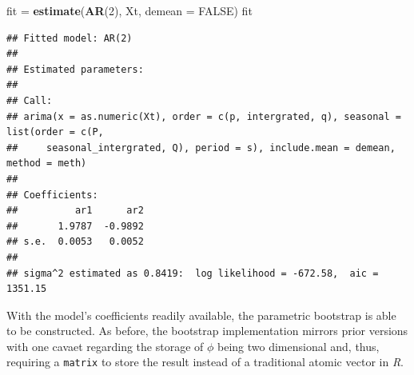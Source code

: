 \documentclass[]{book}
\newenvironment{Shaded}{\begin{snugshade}}{\end{snugshade}}
\newcommand{\CommentTok}[1]{\textcolor[rgb]{0.56,0.35,0.01}{\textit{#1}}}
\newcommand{\ControlFlowTok}[1]{\textcolor[rgb]{0.13,0.29,0.53}{\textbf{#1}}}
\newcommand{\DataTypeTok}[1]{\textcolor[rgb]{0.13,0.29,0.53}{#1}}
\newcommand{\DecValTok}[1]{\textcolor[rgb]{0.00,0.00,0.81}{#1}}
\newcommand{\KeywordTok}[1]{\textcolor[rgb]{0.13,0.29,0.53}{\textbf{#1}}}
\newcommand{\NormalTok}[1]{#1}
\newcommand{\OperatorTok}[1]{\textcolor[rgb]{0.81,0.36,0.00}{\textbf{#1}}}
\newcommand{\OtherTok}[1]{\textcolor[rgb]{0.56,0.35,0.01}{#1}}
\newcommand{\StringTok}[1]{\textcolor[rgb]{0.31,0.60,0.02}{#1}}
\theoremstyle{definition}
\theoremstyle{definition}
\theoremstyle{definition}
\theoremstyle{remark}
\begin{document}
\begin{Shaded}
\begin{Highlighting}[]
\NormalTok{fit =}\StringTok{ }\KeywordTok{estimate}\NormalTok{(}\KeywordTok{AR}\NormalTok{(}\DecValTok{2}\NormalTok{), Xt, }\DataTypeTok{demean =} \OtherTok{FALSE}\NormalTok{)}
\NormalTok{fit}
\end{Highlighting}
\end{Shaded}

\begin{verbatim}
## Fitted model: AR(2)
## 
## Estimated parameters:
## 
## Call:
## arima(x = as.numeric(Xt), order = c(p, intergrated, q), seasonal = list(order = c(P, 
##     seasonal_intergrated, Q), period = s), include.mean = demean, method = meth)
## 
## Coefficients:
##          ar1      ar2
##       1.9787  -0.9892
## s.e.  0.0053   0.0052
## 
## sigma^2 estimated as 0.8419:  log likelihood = -672.58,  aic = 1351.15
\end{verbatim}

With the model's coefficients readily available, the parametric
bootstrap is able to be constructed. As before, the bootstrap
implementation mirrors prior versions with one cavaet regarding the
storage of \(\phi\) being two dimensional and, thus, requiring a
\texttt{matrix} to store the result instead of a traditional atomic
vector in \emph{R}.

\begin{Shaded}
\end{Shaded}
\end{document}
